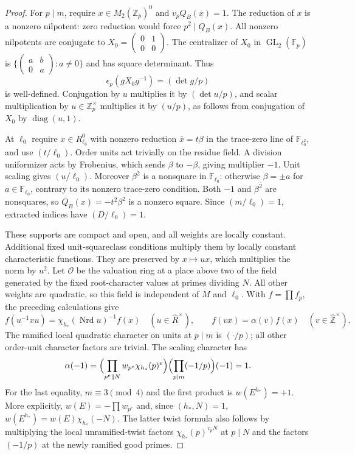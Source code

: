 \begin{proof}
For $p\mid m$, require $x\in M_2(\mathbb Z_p)^0$ and $v_pQ_B(x)=1$.
The reduction of $x$ is a nonzero nilpotent: zero reduction would
force $p^2\mid Q_B(x)$.  All nonzero nilpotents are conjugate to
$X_0=\left(\begin{smallmatrix}0&1\\0&0\end{smallmatrix}\right)$.
The centralizer of $X_0$ in $\operatorname{GL}_2(\mathbb F_p)$ is
$\{\left(\begin{smallmatrix}a&b\\0&a\end{smallmatrix}\right):a\ne0\}$
and has square determinant.  Thus
\[
 \epsilon_p(gX_0g^{-1})=(\det g/p)
\]
is well-defined.  Conjugation by $u$ multiplies it by $(\det u/p)$,
and scalar multiplication by $u\in\mathbb Z_p^\times$ multiplies
it by $(u/p)$, as follows from conjugation of $X_0$ by
$\operatorname{diag}(u,1)$.

At $\ell_0$ require $x\in R_{\ell_0}^0$ with nonzero reduction
$\bar x=t\beta$ in the trace-zero line of $\mathbb F_{\ell_0^2}$,
and use $(t/\ell_0)$.  Order units act trivially on the residue
field.  A division uniformizer acts by Frobenius, which sends
$\beta$ to $-\beta$, giving multiplier $-1$.
Unit scaling gives $(u/\ell_0)$.  Moreover $\beta^2$ is a nonsquare
in $\mathbb F_{\ell_0}$: otherwise $\beta=\pm a$ for
$a\in\mathbb F_{\ell_0}$, contrary to its nonzero trace-zero condition.
Both $-1$ and $\beta^2$ are nonsquares, so $Q_B(x)=-t^2\beta^2$
is a nonzero square.  Since $(m/\ell_0)=1$, extracted indices have
$(D/\ell_0)=1$.

These supports are compact and open, and all weights are locally
constant.  Additional fixed unit-squareclass conditions multiply
them by locally constant characteristic functions.  They are
preserved by $x\mapsto ux$, which multiplies the norm by $u^2$.
Let $\mathcal O$ be the valuation ring at a place above two of the
field generated by the fixed root-character values at primes
dividing $N$.  All other weights are quadratic, so this field is
independent of $M$ and $\ell_0$.
With $f=\prod f_p$, the preceding calculations give
\[
 f(u^{-1}xu)=\chi_{h_*}(\operatorname{Nrd}u)^{-1}f(x)
       \quad (u\in\widehat R^\times),
 \qquad f(vx)=\alpha(v)f(x)\quad(v\in\widehat{\mathbb Z}^{\times}).
\]
The ramified local quadratic character on units at $p\mid m$ is
$(\cdot/p)$; all other order-unit character factors are trivial.
The scaling character has
\[
 \alpha(-1)=
 \Bigl(\prod_{p^e\Vert N}w_{p^e}\chi_{h_*}(p)^e\Bigr)
             \Bigl(\prod_{p\mid m}(-1/p)\Bigr)(-1)=1.
\]
For the last equality, $m\equiv3\pmod4$ and the first product is
$w(E^{h_*})=+1$.  More explicitly,
$w(E)=-\prod w_{p^e}$ and, since $(h_*,N)=1$,
$w(E^{h_*})=w(E)\chi_{h_*}(-N)$.
The latter twist formula also follows by multiplying the local
unramified-twist factors $\chi_{h_*}(p)^{v_pN}$ at $p\mid N$
and the factors $(-1/p)$ at the newly ramified good primes.


\end{proof}

